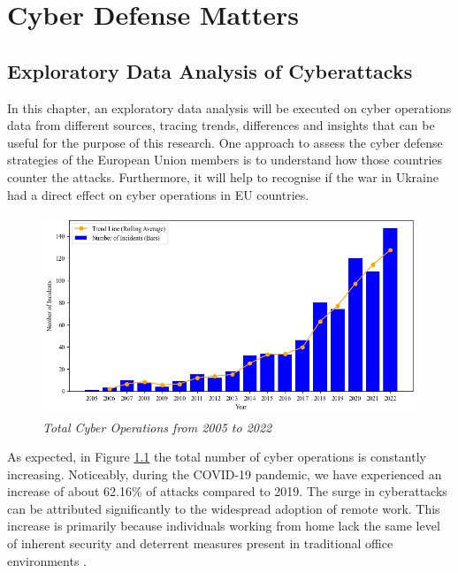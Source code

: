 \chapter{Cyber Defense Matters}

\section{Exploratory Data Analysis of Cyberattacks}

In this chapter, an exploratory data analysis will be executed on cyber operations data from different sources, tracing trends, differences and insights that can be useful for the purpose of this research. One approach to assess the cyber defense strategies of the European Union members is to understand how those countries counter the attacks. Furthermore, it will help to recognise if the war in Ukraine had a direct effect on cyber operations in EU countries. 

\begin{figure}[H]
    \centering
    \includegraphics[width=1\textwidth]{Images/total_cyber.png}
    \caption{\textit{Total Cyber Operations from 2005 to 2022}}
    \label{total_cyber.png}
\end{figure}

As expected, in Figure \ref{total_cyber.png} the total number of cyber operations is constantly increasing. Noticeably, during the COVID-19 pandemic, we have experienced an increase of about 62.16\% of attacks compared to 2019. The surge in cyberattacks can be attributed significantly to the widespread adoption of remote work. This increase is primarily because individuals working from home lack the same level of inherent security and deterrent measures present in traditional office environments \parencite{nabe_2020_impact}. 


